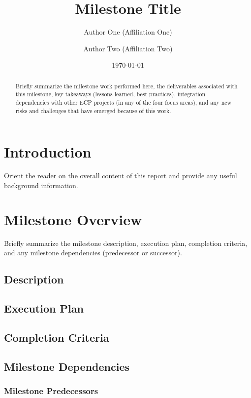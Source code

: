 \documentclass{ecpreport}
\title{Milestone Title}
\author{Author One (Affiliation One)
  \and  Author Two (Affiliation Two)
}
\date{\today}
\begin{document}
\frontmatter


\begin{abstract}
Briefly summarize the milestone work performed here, the deliverables 
associated with this milestone, key takeaways (lessons learned, best 
practices), integration dependencies with other ECP projects (in any 
of the four focus areas), and any new risks and challenges that have 
emerged because of this work.
\end{abstract}


\mainmatter
\section{Introduction}

Orient the reader on the overall content of this report and provide any 
useful background information.

\section{Milestone Overview}

Briefly summarize the milestone description, execution plan, 
completion criteria, and any milestone dependencies (predecessor 
or successor). 

\subsection{Description}
\subsection{Execution Plan}
\subsection{Completion Criteria}
\subsection{Milestone Dependencies}
\subsubsection{Milestone Predecessors}
\end{document}
